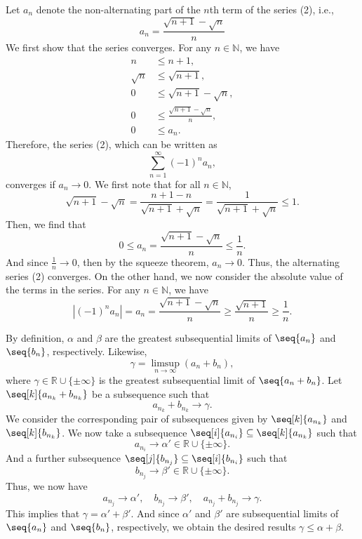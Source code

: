 \documentclass[12pt]{article}
\newcommand{\N}{\mathbb{N}}
\newcommand{\R}{\mathbb{R}}
\begin{document}
Let $a_n$ denote the non-alternating part of the $n$th term of the series (2), i.e.,
    \[
        a_n = \frac{\sqrt{n+1} - \sqrt{n}}{n}
    \]
    We first show that the series converges. For any $n \in \N$, we have
    \begin{align*}
        n &\leq n + 1, \\
        \sqrt{n} &\leq \sqrt{n + 1}, \\
        0 &\leq \sqrt{n + 1} - \sqrt{n}, \\
        0 &\leq \frac{\sqrt{n + 1} - \sqrt{n}}{n}, \\
        0 &\leq a_n.
    \end{align*}
    Therefore, the series (2), which can be written as
    \[
        \sum_{n=1}^\infty (-1)^n a_n,
    \]
    converges if $a_n \to 0$. We first note that for all $n \in \N$,
    \[
        \sqrt{n + 1}-\sqrt{n}  = \frac{n + 1 - n}{\sqrt{n + 1} + \sqrt{n}} = \frac{1}{\sqrt{n + 1} + \sqrt{n}}\leq 1.
    \]
    Then, we find that
    \[
        0 \leq a_n = \frac{\sqrt{n+1} - \sqrt{n}}{n} \leq \frac1n.
    \]
    And since $\frac1n \to 0$, then by the squeeze theorem, $a_n \to 0$. Thus, the alternating series (2) converges. On the other hand, we now consider the absolute value of the terms in the series. For any $n \in \N$, we have
    \[
        \left| (-1)^n a_n \right| = a_n = \frac{\sqrt{n+1} - \sqrt{n}}{n} \geq \frac{\sqrt{n+1}}{n} \geq \frac1n.
    \]

    By definition, $\alpha$ and $\beta$ are the greatest subsequential limits of $\seq{a_n}$ and $\seq{b_n}$, respectively. Likewise,
    \[
        \gamma = \limsup _{n\to \infty} (a_n+b_n),
    \]
    where $\gamma \in \R \cup \{\pm \infty\}$ is the greatest subsequential limit of $\seq{a_n + b_n}$. Let $\seq[k]{a_{n_k} + b_{n_k}}$ be a subsequence such that
    \[
        a_{n_k} + b_{n_k} \to \gamma.
    \]
    We consider the corresponding pair of subsequences given by $\seq[k]{a_{n_k}}$ and $\seq[k]{b_{n_k}}$. We now take a subsequence $\seq[i]{a_{n_i}} \subseteq \seq[k]{a_{n_k}}$ such that
    \[
        a_{n_i} \to \alpha' \in \R \cup \{\pm \infty\}.
    \]
    And a further subsequence $\seq[j]{b_{n_j}} \subseteq \seq[i]{b_{n_i}}$ such that
    \[
        b_{n_j} \to \beta' \in \R \cup \{\pm \infty\}.
    \]
    Thus, we now have
    \[
        a_{n_j} \to \alpha', \quad b_{n_j} \to \beta', \quad a_{n_j} + b_{n_j} \to \gamma.
    \]
    This implies that $\gamma = \alpha' + \beta'$. And since $\alpha'$ and $\beta'$ are subsequential limits of $\seq{a_n}$ and $\seq{b_n}$, respectively, we obtain the desired results $\gamma \leq \alpha + \beta$.
    
\end{document}
